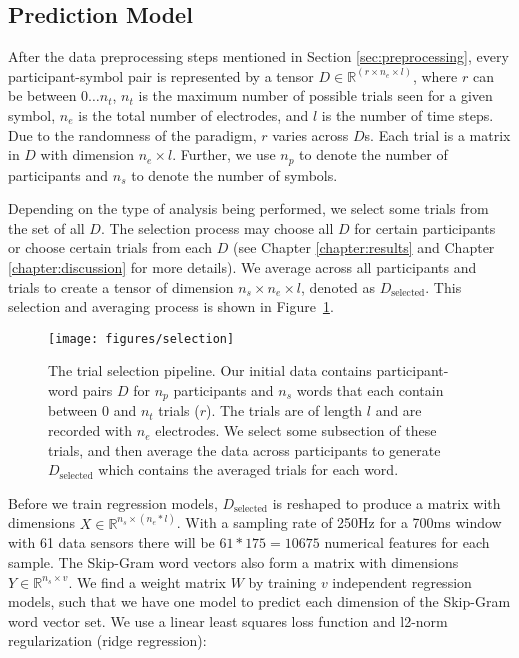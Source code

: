 \subsection{Prediction Model}
After the data preprocessing steps mentioned in Section 
\ref{sec:preprocessing}, every participant-symbol pair is represented by a 
tensor $D \in \mathbb{R}^{(r \times n_e \times l)}$, where $r$ can be between 
$0 \ldots n_t$, $n_t$ is the maximum number of possible trials seen for a given 
symbol, $n_e$ is the total number of electrodes, and $l$ is the number of time 
steps. Due to the randomness of the paradigm, $r$ varies across $D$s. Each 
trial is a matrix in $D$ with dimension $n_e \times l$. Further, we use $n_p$ 
to denote the number of participants and $n_s$ to denote the number of symbols. 

Depending on the type of analysis being performed, we select some trials from 
the set of all $D$. The selection process may choose all $D$ for certain 
participants or choose certain trials from each $D$ (see Chapter 
\ref{chapter:results} and Chapter \ref{chapter:discussion} for more details).  
We average across all participants and trials to create a tensor of dimension 
$n_s \times n_e \times l$, denoted as $D_\text{selected}$. This selection and 
averaging process is shown in Figure~\ref{fig:selection}.

\begin{figure}[t]
 \centerline{
   \texttt{[image: figures/selection]}
 }
 \caption[Trial Selection Pipeline]{
   The trial selection pipeline. Our initial data contains participant-word 
   pairs $D$ for $n_p$ participants and $n_s$ words that each contain between 0 
   and $n_t$ trials ($r$). The trials are of length $l$ and are recorded with 
   $n_e$ electrodes. We select some subsection of these trials, and then 
   average the data across participants to generate $D_{\text{selected}}$ which 
   contains the averaged trials for each word.
 }
 \label{fig:selection}
\end{figure}

Before we train regression models, $D_{\text{selected}}$ is reshaped to produce 
a matrix with dimensions $X \in \mathbb{R}^{n_s \times (n_e * l)}$.  With a 
sampling rate of 250Hz for a 700ms window with 61 data sensors there will be 
$61*175 = 10675$ numerical features for each sample. The Skip-Gram word vectors 
also form a matrix with dimensions $Y \in \mathbb{R}^{n_s \times v}$. We find a 
weight matrix $W$ by training $v$ independent regression models, such that we 
have one model to predict each dimension of the Skip-Gram word vector set. We 
use a linear least squares loss function and l2-norm regularization (ridge 
regression):

